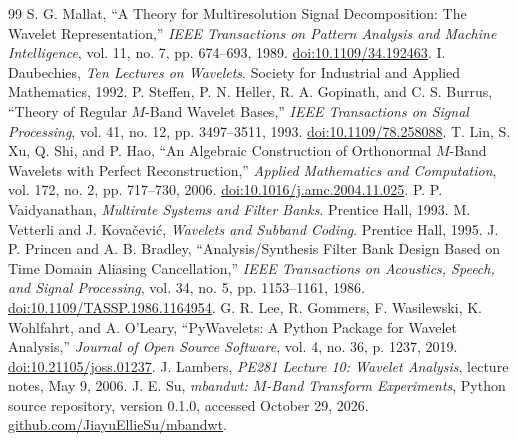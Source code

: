 \documentclass{article}
\theoremstyle{definition}
\theoremstyle{remark}
\begin{document}
\begingroup\footnotesize
\begin{thebibliography}{99}
 S. G. Mallat, ``A Theory for Multiresolution Signal Decomposition: The Wavelet Representation,'' \emph{IEEE Transactions on Pattern Analysis and Machine Intelligence}, vol. 11, no. 7, pp. 674--693, 1989. \href{https://doi.org/10.1109/34.192463}{doi:10.1109/34.192463}.
 I. Daubechies, \emph{Ten Lectures on Wavelets}. Society for Industrial and Applied Mathematics, 1992.
 P. Steffen, P. N. Heller, R. A. Gopinath, and C. S. Burrus, ``Theory of Regular $M$-Band Wavelet Bases,'' \emph{IEEE Transactions on Signal Processing}, vol. 41, no. 12, pp. 3497--3511, 1993. \href{https://doi.org/10.1109/78.258088}{doi:10.1109/78.258088}.
 T. Lin, S. Xu, Q. Shi, and P. Hao, ``An Algebraic Construction of Orthonormal $M$-Band Wavelets with Perfect Reconstruction,'' \emph{Applied Mathematics and Computation}, vol. 172, no. 2, pp. 717--730, 2006. \href{https://doi.org/10.1016/j.amc.2004.11.025}{doi:10.1016/j.amc.2004.11.025}.
 P. P. Vaidyanathan, \emph{Multirate Systems and Filter Banks}. Prentice Hall, 1993.
 M. Vetterli and J. Kova\v{c}evi\'c, \emph{Wavelets and Subband Coding}. Prentice Hall, 1995.
 J. P. Princen and A. B. Bradley, ``Analysis/Synthesis Filter Bank Design Based on Time Domain Aliasing Cancellation,'' \emph{IEEE Transactions on Acoustics, Speech, and Signal Processing}, vol. 34, no. 5, pp. 1153--1161, 1986. \href{https://doi.org/10.1109/TASSP.1986.1164954}{doi:10.1109/TASSP.1986.1164954}.
 G. R. Lee, R. Gommers, F. Wasilewski, K. Wohlfahrt, and A. O'Leary, ``PyWavelets: A Python Package for Wavelet Analysis,'' \emph{Journal of Open Source Software}, vol. 4, no. 36, p. 1237, 2019. \href{https://doi.org/10.21105/joss.01237}{doi:10.21105/joss.01237}.
 J. Lambers, \emph{PE281 Lecture 10: Wavelet Analysis}, lecture notes, May 9, 2006.
 J. E. Su, \emph{mbandwt: $M$-Band Transform Experiments}, Python source repository, version 0.1.0, accessed October 29, 2026. \href{https://github.com/JiayuEllieSu/mbandwt}{github.com/JiayuEllieSu/mbandwt}.
\end{thebibliography}\endgroup
\end{document}
